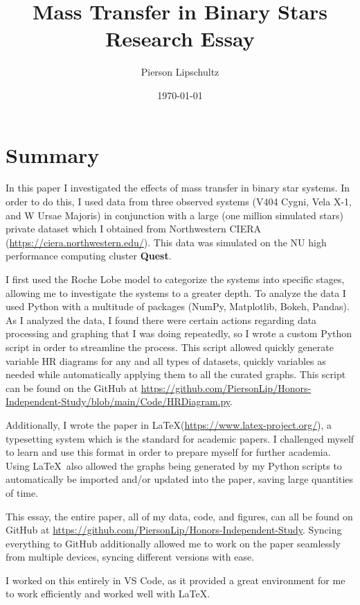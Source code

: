 \documentclass[12pt, a4paper]{article}
\title{Mass Transfer in Binary Stars Research Essay}
\author{Pierson Lipschultz}
\begin{document}
\date{\today}
\maketitle
\section{Summary}
    In this paper I investigated the effects of mass transfer in binary star systems. In order to do this,  I used data from three observed systems (V404 Cygni, Vela X-1, and W Ursae Majoris) in conjunction with a large (one million simulated stars) private dataset which I obtained from Northwestern CIERA (\url{https://ciera.northwestern.edu/}). This data was simulated on the NU high performance computing cluster \textbf{Quest}. 

    I first used the Roche Lobe model to categorize the systems into specific stages, allowing me to investigate the systems to a greater depth. To analyze the data I used Python with a multitude of packages (NumPy, Matplotlib, Bokeh, Pandas). As I analyzed the data, I found there were certain actions regarding data processing and graphing that I was doing repeatedly, so I wrote a custom Python script in order to streamline the process. This script allowed quickly generate variable HR diagrams for any and all types of datasets, quickly variables as needed while automatically applying them to all the curated graphs. This script can be found on the GitHub at \url{https://github.com/PiersonLip/Honors-Independent-Study/blob/main/Code/HRDiagram.py}.

	Additionally, I wrote the paper in \LaTeX (\url{https://www.latex-project.org/}), a typesetting system which is the standard for academic papers. I challenged myself to learn and use this format in order to prepare myself for further academia. Using \LaTeX ~also allowed the graphs being generated by my Python scripts to automatically be imported and/or updated into the paper, saving large quantities of time.

	This essay, the entire paper, all of my data, code, and figures, can all be found on GitHub at \url{https://github.com/PiersonLip/Honors-Independent-Study}. Syncing everything to GitHub additionally allowed me to work on the paper seamlessly from multiple devices, syncing different versions with ease. 

    I worked on this entirely in VS Code, as it provided a great environment for me to work efficiently and worked well with \LaTeX.
\end{document}
